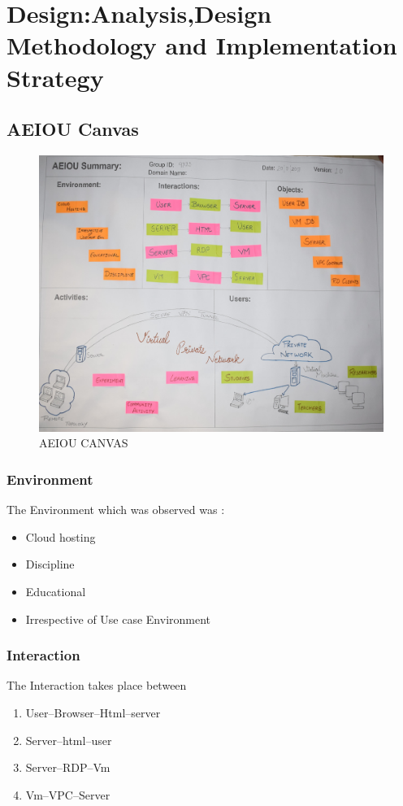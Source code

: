 \documentclass[12pt,a4paper,final,oneside]{report}
\begin{document}
\chapter{Design:Analysis,Design Methodology and Implementation Strategy}	
	\raggedright \section{AEIOU Canvas} 
	\textbf{}
	\noindent\begin{figure}[h]
		\centering
		\includegraphics[width=1.0\linewidth,angle=0]{aeiou.jpg}
		\caption{AEIOU CANVAS }
	\end{figure}
	\subsection{Environment}
\textbf{}
 \flushleft The Environment which was observed was :
\begin{itemize}
\item Cloud hosting
\item Discipline 
\item Educational
\item Irrespective of Use case Environment 
\end{itemize}	
\subsection{Interaction}
\textbf{}
The Interaction takes place between 
\begin{enumerate}
\item User--Browser--Html--server
\item Server--html--user
\item Server--RDP--Vm
\item Vm--VPC--Server
\end{enumerate} 
\end{document}
